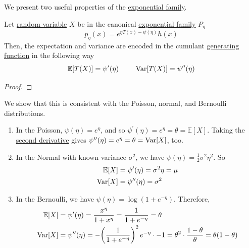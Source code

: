    We present two useful properties of the \hyperref[def:exponential-family]{exponential family}. 

    \begin{theorem}[Moments]
      \label{thm:moments}
    Let \hyperref[prob-def:random-variable]{random variable} $X$ be in the canonical \hyperref[def:exponential-family]{exponential family} $P_\eta$ 
    \begin{equation}
      p_\eta (x) = e^{\eta T(x) - \psi(\eta)} h(x)
    \end{equation}
    Then, the expectation and variance are encoded in the cumulant \hyperref[sp-def:generating-function]{generating function} in the following way 
    \begin{equation}
      \mathbb{E} [T(X)] = \psi^\prime (\eta) \;\;\;\;\;\;\;\; \operatorname{Var}[T(X)] = \psi^{\prime\prime} (\eta)
    \end{equation}
    \end{theorem}
    \begin{proof}

    \end{proof}

    \begin{example}
      \label{ex:poisson-normal-and-bernoulli-as-exponential}
    We show that this is consistent with the Poisson, normal, and Bernoulli distributions. 
    \begin{enumerate}
        \item In the Poisson, $\psi(\eta) = e^{\eta}$, and so $\psi^\prime(\eta) = e^\eta = \theta = \mathbb{E}[X]$. Taking the \hyperref[mv-def:second-derivative]{second derivative} gives $\psi^{\prime\prime}(\eta) = e^\eta = \theta = \operatorname{Var}[X]$, too. \
        
        \item In the Normal with known variance $\sigma^2$, we have $\psi(\eta) = \frac{1}{2} \sigma^2 \eta^2$. So 
        \begin{align*}
            \mathbb{E}[X] & = \psi^\prime (\eta) = \sigma^2 \eta = \mu \\
            \operatorname{Var}[X] & = \psi^{\prime\prime} (\eta) = \sigma^2
        \end{align*}

        \item In the Bernoulli, we have $\psi(\eta) = \log(1 + e^{-\eta})$. Therefore, 
        \begin{align*}
            \mathbb{E}[X] & = \psi^\prime (\eta) = \frac{x^\eta}{1 + x^{\eta}} = \frac{1}{1 + e^{-\eta}} = \theta \\
            \operatorname{Var}[X] & = \psi^{\prime\prime} (\eta) = -\bigg(\frac{1}{1 + e^{-\eta}}\bigg)^2 \, e^{-\eta} \cdot -1 = \theta^2 \cdot \frac{1 - \theta}{\theta} = \theta (1 - \theta) 
        \end{align*}
    \end{enumerate}
    \end{example}

